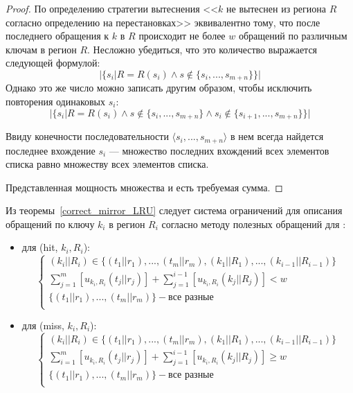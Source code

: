 \begin{proof}
По определению стратегии вытеснения \LRU <<$k$ не вытеснен из региона $R$ согласно определению на перестановках>> эквивалентно тому, что после последнего обращения к $k$ в $R$ происходит не более $w$ обращений по различным ключам в регион $R$. Несложно убедиться, что это количество выражается следующей формулой: $$|\{s_i| R = R(s_i) \wedge s \notin \{s_i, ..., s_{m+n}\}\}|$$
Однако это же число можно записать другим образом, чтобы исключить повторения одинаковых $s_i$:
$$|\{s_i| R = R(s_i) \wedge s \notin \{s_i, ..., s_{m+n}\} \wedge s_i \notin \{s_{i+1}, ..., s_{m+n}\}\}|$$

Ввиду конечности последовательности $\langle s_i, ..., s_{m+n}\rangle$ в нем всегда найдется последнее вхождение $s_i$ --- множество последних вхождений всех элементов списка равно множеству всех элементов списка.

Представленная мощность множества и есть требуемая сумма.
\end{proof}

Из теоремы~\ref{correct_mirror_LRU} следует система ограничений для
описания обращений по ключу $k_i$ в регион $R_i$ согласно методу полезных обращений для \LRU: \begin{itemize}
\item для (hit, $k_i, R_i$):
$$
\left\{\begin{array}{l} (k_i||R_i) \in \{(t_1||r_1), ..., (t_m||r_m), (k_1||R_1),
..., (k_{i-1}||R_{i-1})\}\\
\sum\limits_{j=1}^m [u_{k_i,R_i}(t_j||r_j)] + \sum\limits_{j=1}^{i-1} [u_{k_i,R_i}(k_j||R_j)] < w\\
\{(t_1||r_1), ..., (t_m||r_m)\} - \mbox{все разные}\\
\end{array} \right.
$$
\item для (miss, $k_i, R_i$):
$$
\left\{\begin{array}{l} (k_i||R_i) \in \{(t_1||r_1), ..., (t_m||r_m), (k_1||R_1),
..., (k_{i-1}||R_{i-1})\}\\
\sum\limits_{i=1}^m [u_{k_i,R_i}(t_j||r_j)] + \sum\limits_{j=1}^{i-1} [u_{k_i,R_i}(k_j||R_j)]
\geqslant w\\
\{(t_1||r_1), ..., (t_m||r_m)\} - \mbox{все разные}\\
\end{array} \right.
$$
\end{itemize}


